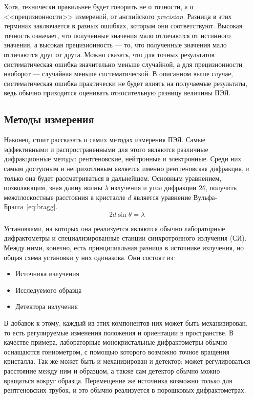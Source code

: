 \documentclass[a4paper,14pt]{extarticle}
\begin{document}
Хотя, технически правильнее будет говорить не о точности, а о <<прецизионности>> измерений, от английского \textit{precision}.
Разница в этих терминах заключается в разных ошибках, которым они соответствуют.
Высокая точность означает, что полученные значения мало отличаются от истинного значения, а высокая прецизионность --- то, что полученные значения мало отличаются друг от друга.
Можно сказать, что для точных результатов систематическая ошибка значительно меньше случайной, а для прецизионности наоборот --- случайная меньше систематической.
В описанном выше случае, систематическая ошибка практически не будет влиять на получаемые результаты, ведь обычно приходится оценивать относительную разницу величины ПЭЯ.

\subsection{Методы измерения}

Наконец, стоит рассказать о самих методах измерения ПЭЯ.
Самые эффективными и распространенными для этого являются различные дифракционные методы: рентгеновские, нейтронные и электронные.
Среди них самым доступным и неприхотливым является именно рентгеновская дифракция, и только она будет рассматриваться в дальнейшем.
Основным уравнением, позволяющим, зная длину волны $\lambda$ излучения и угол дифракции $2\theta$, получить межплоскостные расстояния в кристалле $d$ является уравнение Вульфа-Брэгга~\ref{eq:bragg}.
\begin{equation} \label{eq:bragg} 
    2 d \sin{\theta} = \lambda
\end{equation}

Установками, на которых она реализуется являются обычно лабораторные дифрактометры и специализированные станции синхротронного излучения (СИ).
Между ними, конечно, есть принципиальная разница в источнике излучения, но общая схема установки у них одинакова.
Они состоят из:
\begin{itemize}
    \item Источника излучения
    \item Исследуемого образца
    \item Детектора излучения
\end{itemize}
В добавок к этому, каждый из этих компонентов них может быть механизирован, то есть регулируемые изменения положения и ориентации в пространстве.
В качестве примера, лабораторные монокристальные дифрактометры обычно оснащаются гониометром, с помощью которого возможно точное вращения кристалла.
Так же может быть и механизирован и детектор: может регулироваться расстояние между ним и образцом, а также сам детектор обычно можно вращаться вокруг образца.
Перемещение же источника возможно только для рентгеновских трубок, и это обычно реализуется в порошковых дифрактометрах.
\end{document}

